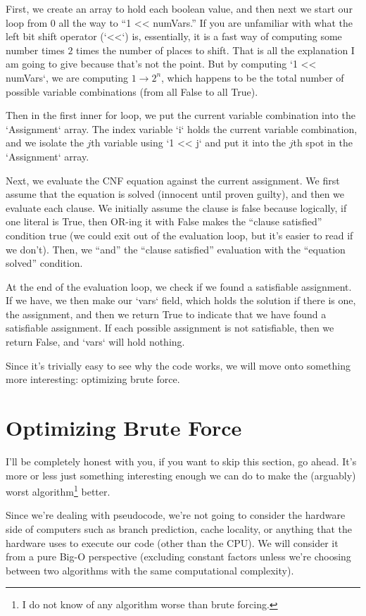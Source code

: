 First, we create an array to hold each boolean value, and then next we start
our loop from $0$ all the way to ``1 << numVars.'' If you are unfamiliar with
what the left bit shift operator (`<<`) is, essentially, it is a fast way of
computing some number times $2$ times the number of places to shift. That is
all the explanation I am going to give because that's not the point. But by
computing `1 << numVars`, we are computing $1 \rightarrow 2^n$, which
happens to be the total number of possible variable combinations (from all
False to all True).

Then in the first inner for loop, we put the current variable combination into
the `Assignment` array. The index variable `i` holds the current variable
combination, and we isolate the $j$th variable using `1 << j` and put it into
the $j$th spot in the `Assignment` array.

Next, we evaluate the CNF equation against the current assignment. We first
assume that the equation is solved (innocent until proven guilty), and then we
evaluate each clause. We initially assume the clause is false because logically,
if one literal is True, then OR-ing it with False makes the ``clause satisfied''
condition true (we could exit out of the evaluation loop, but it's easier to read
if we don't). Then, we ``and'' the ``clause satisfied'' evaluation with the
``equation solved'' condition.

At the end of the evaluation loop, we check if we found a satisfiable
assignment. If we have, we then make our `vars` field, which holds the solution
if there is one, the assignment, and then we return True to indicate that we
have found a satisfiable assignment. If each possible assignment is not
satisfiable, then we return False, and `vars` will hold nothing.

Since it's trivially easy to see why the code works, we will move onto something
more interesting: optimizing brute force.

\section{Optimizing Brute Force}

I'll be completely honest with you, if you want to skip this section, go ahead.
It's more or less just something interesting enough we can do to make the
(arguably) worst algorithm\footnote{I do not know of any algorithm worse than
brute forcing.} better.

Since we're dealing with pseudocode, we're not going to consider the hardware
side of computers such as branch prediction, cache locality, or anything that
the hardware uses to execute our code (other than the CPU). We will consider
it from a pure Big-O perspective (excluding constant factors unless we're
choosing between two algorithms with the same computational complexity).

